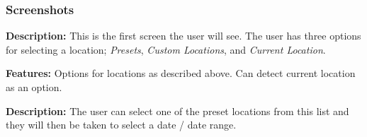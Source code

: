 \documentclass[11pt,english,numbers=endperiod,parskip=half]{scrartcl}
\begin{document}
\subsubsection{Screenshots}
\begin{figure}[H]
\end{figure}
\bigskip
\textbf{Description: }This is the first screen the user will see.
The user has three options for selecting a location;
\textit{Presets}, \textit{Custom Locations}, and \textit{Current Location}.

\textbf{Features: }Options for locations as described above. Can detect current
location as an option.

\begin{figure}[H]
\end{figure}
\bigskip
\textbf{Description: }The user can select one of the preset locations from this
list and they will then be taken to select a date / date range.
\end{document}
